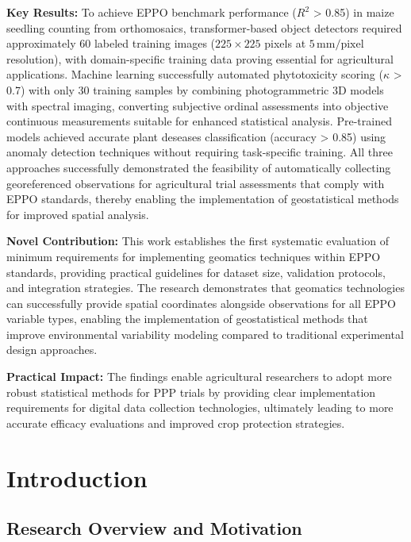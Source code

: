 \documentclass[12pt,a4paper,oneside]{report}
\begin{document}
{\textbf{Key Results:} To achieve EPPO benchmark performance ($R^2$ > 0.85) in 
maize seedling counting from orthomosaics, transformer-based object detectors 
required approximately 60 labeled training images ($225 \times 225$ pixels at 
$5\,\text{mm}/\text{pixel}$ resolution), with domain-specific training data 
proving essential for agricultural applications. Machine learning successfully 
automated phytotoxicity scoring ($\kappa$ > 0.7) with only 30 training samples 
by combining photogrammetric 3D models with spectral imaging, converting 
subjective ordinal assessments into objective continuous measurements suitable 
for enhanced statistical analysis. 
Pre-trained models achieved accurate plant deseases classification (accuracy > 0.85) 
using anomaly detection techniques without requiring task-specific training. 
All three approaches successfully demonstrated the feasibility of automatically 
collecting georeferenced observations for agricultural trial assessments that 
comply with EPPO standards, thereby enabling the implementation of geostatistical 
methods for improved spatial analysis.

\textbf{Novel Contribution:} This work establishes the first systematic 
evaluation of minimum requirements for implementing geomatics techniques within 
EPPO standards, providing practical guidelines for dataset size, validation 
protocols, and integration strategies. The research demonstrates that geomatics 
technologies can successfully provide spatial coordinates alongside observations 
for all EPPO variable types, enabling the implementation of geostatistical 
methods that improve environmental variability modeling compared to traditional 
experimental design approaches.

\textbf{Practical Impact:} The findings enable agricultural researchers to adopt 
more robust statistical methods for PPP trials by providing clear implementation 
requirements for digital data collection technologies, ultimately leading to more 
accurate efficacy evaluations and improved crop protection strategies.}

\clearpage

\tableofcontents
\newpage

\chapter{Introduction}

\section{Research Overview and Motivation}
\end{document}
